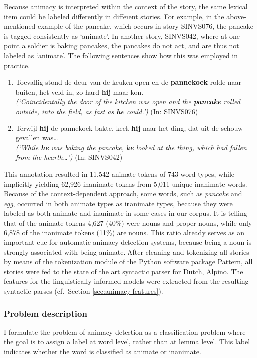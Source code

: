 Because animacy is interpreted within the context of the story, the same lexical item could be labeled differently in different stories. For example, in the above-mentioned example of the pancake, which occurs in story SINVS076, the pancake is tagged consistently as `animate'. In another story, SINVS042, where at one point a soldier is baking pancakes, the pancakes do not act, and are thus not labeled as `animate'. The following sentences show how this was employed in practice.

\begin{enumerate}
\item Toevallig stond de deur van de keuken open en de \textbf{pannekoek} rolde naar buiten, het veld in, zo hard \textbf{hij} maar kon.\\
\emph{(`Coincidentally the door of the kitchen was open and the \textbf{pancake} rolled outside, into the field, as fast as \textbf{he} could.')} (In: SINVS076)

\item Terwijl \textbf{hij} de pannekoek bakte, keek \textbf{hij} naar het ding, dat uit de schouw gevallen was\ldots\\
\emph{(`While \textbf{he} was baking the pancake, \textbf{he} looked at the thing, which had fallen from the hearth\ldots')} (In: SINVS042)
\end{enumerate}

This annotation resulted in 11,542 animate tokens of 743 word types, while implicitly yielding 62,926 inanimate tokens from 5,011 unique inanimate words. Because of the context-dependent approach, some words, such as \textit{pancake} and \textit{egg}, occurred in both animate types as inanimate types, because they were labeled as both animate and inanimate in some cases in our corpus. It is telling that of the animate tokens 4,627 (40\%) were nouns and proper nouns, while only 6,878 of the inanimate tokens (11\%) are nouns. This ratio  already serves as an important cue for automatic animacy detection systems, because being a noun is strongly associated with being animate. After cleaning and tokenizing all stories by means of the tokenization module of the Python software package Pattern\autocite{smedt:2012}, all stories were fed to the state of the art syntactic parser for Dutch, Alpino\autocite{bouma:2001}. The features for the linguistically informed models were extracted from the resulting syntactic parses (cf.\ Section \ref{sec:animacy-features}).

\subsubsection{Problem description}
I formulate the problem of animacy detection as a classification problem where the goal is to assign a label at word level, rather than at lemma level. This label indicates whether the word is classified as animate or inanimate.

